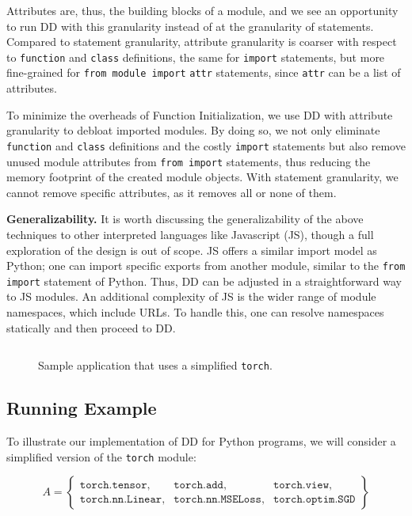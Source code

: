 \documentclass[sigplan,screen]{acmart}
\newcommand{\heading}[1]{\vspace{4pt}\noindent\textbf{#1.}}
\newcounter{example}
\newcommand{\module}[1]{{\texttt{#1}}}
\newcommand{\attribute}[1]{\texttt{#1}}
\begin{document}
Attributes are, thus, the building blocks of a module, and we see an opportunity to run DD with this granularity instead of at the granularity of statements.
Compared to statement granularity, attribute granularity is coarser with respect to \verb|function| and \verb|class| definitions, the same for \verb|import| statements, but more fine-grained for \verb|from module import| \verb|attr| statements, since \verb|attr| can be a list of attributes.

To minimize the overheads of Function Initialization, we use DD with attribute granularity to debloat imported modules.
By doing so, we not only eliminate \verb|function| and \verb|class| definitions and the costly \verb|import| statements but also remove unused module attributes from \verb|from import| statements, thus reducing the memory footprint of the created module objects.
With statement granularity, we cannot remove specific attributes, as it removes all or none of them.

\heading{Generalizability}
It is worth discussing the generalizability of the above techniques to other interpreted languages like Javascript (JS), though a full exploration of the design is out of scope.
JS offers a similar import model as Python; one can import specific exports from another module, similar to the \texttt{from import} statement of Python. 
Thus, DD can be adjusted in a straightforward way to JS modules.
An additional complexity of JS is the wider range of module namespaces, which include URLs.
To handle this, one can resolve namespaces statically and then proceed to DD.


\begin{figure}[t]
    \centering
    \inputminted[fontsize=\scriptsize]{python}{chapters/6_debloating/torch-app.py}
    \caption{Sample application that uses a simplified \module{torch}.}
    \label{fig:torch-example}
\end{figure}
 
\subsection{Running Example}

To illustrate our implementation of DD for Python programs, we will consider a simplified version of the \module{torch} module:

\vspace{-0.5em}
{\footnotesize
\[
A = \left\{
\begin{array}{lll}
\attribute{torch.tensor}, & \attribute{torch.add}, &\attribute{torch.view}, \\
\attribute{torch.nn.Linear}, & \attribute{torch.nn.MSELoss}, & \attribute{torch.optim.SGD}
\end{array}
\right\}
\]
}
\end{document}
